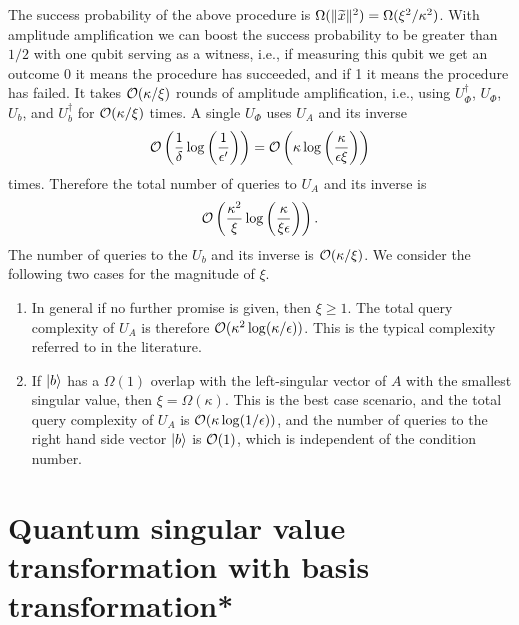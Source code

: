 The success probability of the above procedure is $\Omega(\|\widetilde{x}\|^2)=\Omega(\xi^2/\kappa^2)$. With amplitude amplification we can boost the success probability to be greater than $1/2$ with one qubit serving as a witness, i.e., if measuring this qubit we get an outcome 0 it means the procedure has succeeded, and if 1 it  means the procedure has failed. 
It takes $\mathcal{O}(\kappa/\xi)$ rounds of amplitude amplification, i.e., using $U_{\Phi}^\dagger$, $U_{\Phi}$, $U_b$, and $U_b^\dagger$ for $\mathcal{O}(\kappa/\xi)$ times.
A single $U_{\Phi}$ uses $U_A$ and its inverse
\begin{equation}
\mathcal{O}\left(\frac{1}{\delta}\log\left(\frac{1}{\epsilon'}\right)\right)
=\mathcal{O}\left(\kappa\log\left(\frac{\kappa}{\epsilon\xi}\right)\right)
\end{equation}
times.
Therefore the total number of queries to $U_A$ and its inverse is 
\begin{equation}
\mathcal{O}\left(\frac{\kappa^2}{\xi} \log\left(\frac{\kappa}{\xi\epsilon}\right)\right).
\end{equation}
The number of queries to the $U_b$ and its inverse is $\mathcal{O}(\kappa/\xi)$. 
We consider the following two cases for the magnitude of $\xi$. 
\begin{enumerate}\label{enum:two_cases}
    \item  In general if no further promise is given, then $\xi\geq 1$. The total query complexity of $U_A$ is therefore $\mathcal{O}(\kappa^2 \log(\kappa/\epsilon))$. This is the typical complexity referred to in the literature.
    \item If $\ket{b}$ has a $\Omega(1)$ overlap with the left-singular vector of $A$ with the smallest singular value, then $\xi=\Omega(\kappa)$. This is the best case scenario, and the total query complexity of $U_A$ is  $\mathcal{O}(\kappa \log(1/\epsilon))$, and the number of queries to the right hand side vector $\ket{b}$ is $\mathcal{O}(1)$, which is independent of the condition number. 
\end{enumerate} 



\section{Quantum singular value transformation with basis transformation*}

